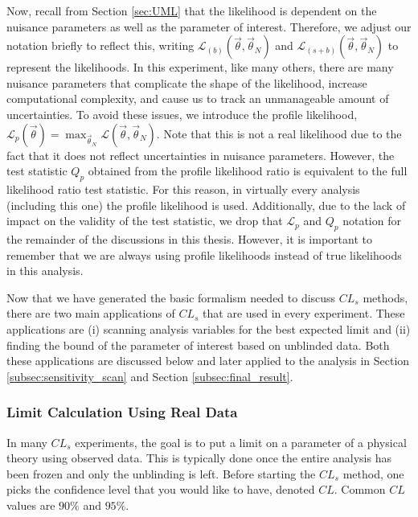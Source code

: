 Now, recall from Section \ref{sec:UML} that the likelihood is dependent on the nuisance parameters as well as the parameter of interest. Therefore, we adjust our notation briefly to reflect this, writing $\mathcal{L}_{(b)}(\vec{\theta}, \vec{\theta}_N)$ and $\mathcal{L}_{(s+b)}(\vec{\theta}, \vec{\theta}_N)$ to represent the likelihoods. In this experiment, like many others, there are many nuisance parameters that complicate the shape of the likelihood, increase computational complexity, and cause us to track an unmanageable amount of uncertainties. To avoid these issues, we introduce the profile likelihood, $\mathcal{L}_p(\vec{\theta}) = \max_{\vec{\theta}_N} \mathcal{L}(\vec{\theta}, \vec{\theta}_N)$. Note that this is not a real likelihood due to the fact that it does not reflect uncertainties in nuisance parameters. However, the test statistic $Q_p$ obtained from the profile likelihood ratio is equivalent to the full likelihood ratio test statistic. For this reason, in virtually every analysis (including this one) the profile likelihood is used. Additionally, due to the lack of impact on the validity of the test statistic, we drop that $\mathcal{L}_p$ and $Q_p$ notation for the remainder of the discussions in this thesis. However, it is important to remember that we are always using profile likelihoods instead of true likelihoods in this analysis. 

Now that we have generated the basic formalism needed to discuss $CL_s$ methods, there are two main applications of $CL_s$ that are used in every experiment. These applications are (i) scanning analysis variables for the best expected limit and (ii) finding the bound of the parameter of interest based on unblinded data. Both these applications are discussed below and later applied to the analysis in Section \ref{subsec:sensitivity_scan} and Section \ref{subsec:final_result}.

\subsubsection{Limit Calculation Using Real Data}
\label{subsubsec:limit_calculation_theory}

In many $CL_s$ experiments, the goal is to put a limit on a parameter of a physical theory using observed data. This is typically done once the entire analysis has been frozen and only the unblinding is left. Before starting the $CL_s$ method, one picks the confidence level that you would like to have, denoted $CL$. Common $CL$ values are $90\%$ and $95\%$. 

